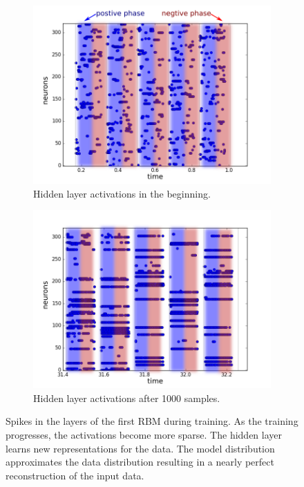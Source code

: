 \begin{figure}[h!]
	\begin{subfigure}[t]{.45\textwidth}
  		\centering
  		\includegraphics[width=.9\linewidth]{imgs/7x7/00006_h.png}
  		\caption{Hidden layer activations in the beginning.}
  		\label{fig:sub2}
	\end{subfigure}
	\begin{subfigure}[t]{.45\textwidth}
  		\centering
  		\includegraphics[width=.9\linewidth]{imgs/7x7/01992_h.png}
  		\caption{Hidden layer  activations after 1000 samples.}
  		\label{fig:sub2}
	\end{subfigure}
	\caption[Spikes in the layers of the first RBM during training.]{Spikes in the layers of the first RBM during training. As the training progresses, the activations become more sparse. The hidden layer learns new representations for the data. The model distribution approximates the data distribution resulting in a nearly perfect reconstruction of the input data.}
	\label{fig:stripesspl1}
\end{figure}

